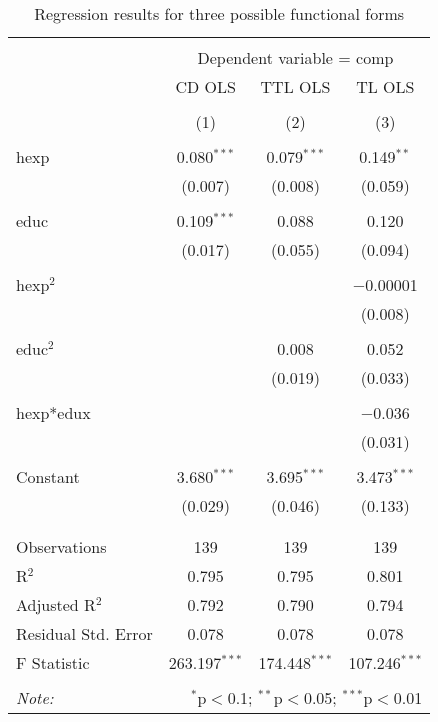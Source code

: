 \documentclass[12pt,a4paper]{article}\usepackage[]{graphicx}\usepackage[]{color}
\begin{document}
\begin{table}[!htbp] \centering 
  \caption{Regression results for three possible functional forms} 
  \label{} 
\small 
\begin{tabular}{@{\extracolsep{5pt}}lccc} 
\\[-1.8ex]\hline 
\hline \\[-1.8ex] 
 & \multicolumn{3}{c}{Dependent variable = comp} \\ 
\cline{2-4} 
 & CD OLS & TTL OLS & TL OLS \\ 
\\[-1.8ex] & (1) & (2) & (3)\\ 
\hline \\[-1.8ex] 
 hexp & 0.080$^{***}$ & 0.079$^{***}$ & 0.149$^{**}$ \\ 
  & (0.007) & (0.008) & (0.059) \\ 
  & & & \\ 
 educ & 0.109$^{***}$ & 0.088 & 0.120 \\ 
  & (0.017) & (0.055) & (0.094) \\ 
  & & & \\ 
 hexp$^2$ &  &  & $-$0.00001 \\ 
  &  &  & (0.008) \\ 
  & & & \\ 
 educ$^2$ &  & 0.008 & 0.052 \\ 
  &  & (0.019) & (0.033) \\ 
  & & & \\ 
 hexp*edux &  &  & $-$0.036 \\ 
  &  &  & (0.031) \\ 
  & & & \\ 
 Constant & 3.680$^{***}$ & 3.695$^{***}$ & 3.473$^{***}$ \\ 
  & (0.029) & (0.046) & (0.133) \\ 
  & & & \\ 
\hline \\[-1.8ex] 
Observations & 139 & 139 & 139 \\ 
R$^{2}$ & 0.795 & 0.795 & 0.801 \\ 
Adjusted R$^{2}$ & 0.792 & 0.790 & 0.794 \\ 
Residual Std. Error & 0.078 & 0.078 & 0.078 \\ 
F Statistic & 263.197$^{***}$ & 174.448$^{***}$ & 107.246$^{***}$ \\ 
\hline 
\hline \\[-1.8ex] 
\textit{Note:}  & \multicolumn{3}{r}{$^{*}$p$<$0.1; $^{**}$p$<$0.05; $^{***}$p$<$0.01} \\ 
\end{tabular} 
\end{table} 
\end{document}
